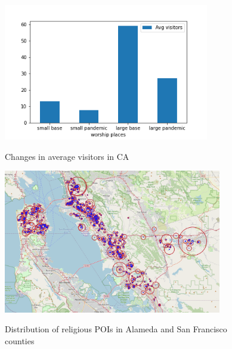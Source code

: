 \documentclass[12pt,english]{article}
\begin{document}
	\begin{figure}[h]
		\centering
		\caption{\small Changes in average visitors in CA}
		\includegraphics[width=0.8\textwidth, center]{./figures/avg_visit.png}
		\captionsetup{width=1.0\textwidth}
		\label{figure2}
	\end{figure}
	
	
	\begin{figure}[h]
		\centering
		\caption{\small Distribution of religious POIs in Alameda and San Francisco counties}
		\includegraphics[width=0.85\textwidth, center]{./figures/2.POIs.png}
		\captionsetup{width=1.0\textwidth}
		\label{figure3}
	\end{figure}
	
	
	
	
	\pagebreak
	\begingroup
	\setlength\bibitemsep{0pt}
	\endgroup
	\pagebreak
	
	
	
	
\end{document}

